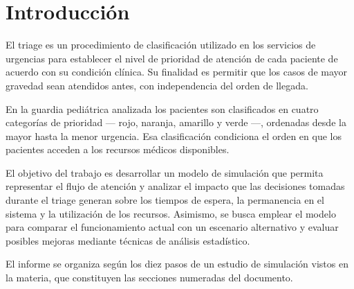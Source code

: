 \section*{Introducción}

El triage es un procedimiento de clasificación utilizado en los servicios de
urgencias para establecer el nivel de prioridad de atención de cada paciente
de acuerdo con su condición clínica. Su finalidad es permitir que los casos
de mayor gravedad sean atendidos antes, con independencia del orden de
llegada.

En la guardia pediátrica analizada los pacientes son clasificados en cuatro
categorías de prioridad --- rojo, naranja, amarillo y verde ---, ordenadas
desde la mayor hasta la menor urgencia. Esa clasificación condiciona el orden
en que los pacientes acceden a los recursos médicos disponibles.

El objetivo del trabajo es desarrollar un modelo de simulación que permita
representar el flujo de atención y analizar el impacto que las decisiones
tomadas durante el triage generan sobre los tiempos de espera, la permanencia
en el sistema y la utilización de los recursos. Asimismo, se busca emplear el
modelo para comparar el funcionamiento actual con un escenario alternativo y
evaluar posibles mejoras mediante técnicas de análisis estadístico.

El informe se organiza según los diez pasos de un estudio de simulación
vistos en la materia, que constituyen las secciones numeradas del documento.


